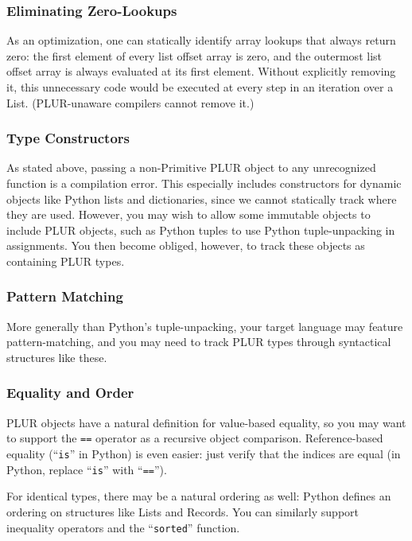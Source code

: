 \documentclass[10pt, conference, compsocconf]{IEEEtran}
\begin{document}
\subsubsection{Eliminating Zero-Lookups}

As an optimization, one can statically identify array lookups that always return zero: the first element of every list offset array is zero, and the outermost list offset array is always evaluated at its first element. Without explicitly removing it, this unnecessary code would be executed at every step in an iteration over a List. (PLUR-unaware compilers cannot remove it.)

\subsubsection{Type Constructors}

As stated above, passing a non-Primitive PLUR object to any unrecognized function is a compilation error. This especially includes constructors for dynamic objects like Python lists and dictionaries, since we cannot statically track where they are used. However, you may wish to allow some immutable objects to include PLUR objects, such as Python tuples to use Python tuple-unpacking in assignments. You then become obliged, however, to track these objects as containing PLUR types.

\subsubsection{Pattern Matching}

More generally than Python's tuple-unpacking, your target language may feature pattern-matching, and you may need to track PLUR types through syntactical structures like these.

\subsubsection{Equality and Order}

PLUR objects have a natural definition for value-based equality, so you may want to support the {\tt ==} operator as a recursive object comparison. Reference-based equality (``{\tt is}'' in Python) is even easier: just verify that the indices are equal (in Python, replace ``{\tt is}'' with ``{\tt ==}'').

For identical types, there may be a natural ordering as well: Python defines an ordering on structures like Lists and Records. You can similarly support inequality operators and the ``{\tt sorted}'' function.
\end{document}
